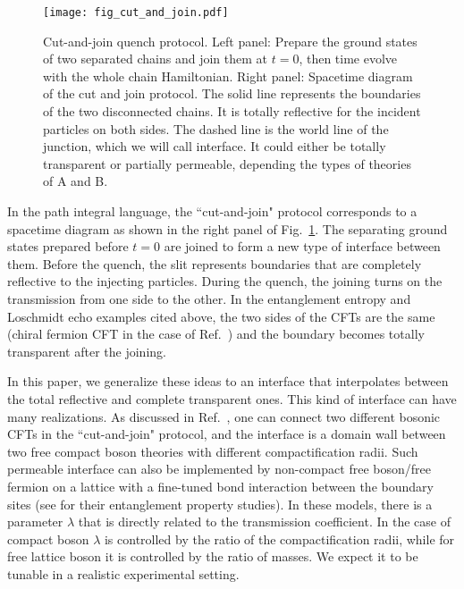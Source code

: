\begin{figure}[h]
\texttt{[image: fig\_cut\_and\_join.pdf]}
\caption{Cut-and-join quench protocol. Left panel: Prepare the ground states of two separated chains and join them at $t = 0$, then time evolve with the whole chain Hamiltonian. Right panel: Spacetime diagram of the cut and join protocol. The solid line represents the boundaries of the two disconnected chains. It is totally reflective for the incident particles on both sides. The dashed line is the world line of the junction, which we will call interface. It could either be totally transparent or partially permeable, depending the types of theories of A and B.}
\label{fig:cut-and-join}
\end{figure}

In the path integral language, the ``cut-and-join" protocol corresponds to a spacetime diagram as shown in the right panel of Fig.~\ref{fig:cut-and-join}. The separating ground states prepared before $t = 0$ are joined to form a new type of interface between them. Before the quench, the slit represents boundaries that are completely reflective to the injecting particles. During the quench, the joining turns on the transmission from one side to the other. In the entanglement entropy and Loschmidt echo examples cited above\cite{calabrese_entanglement_2007, calabrese_quantum_2016, vasseur_universal_2014}, the two sides of the CFTs are the same (chiral fermion CFT in the case of Ref.~) and the boundary becomes totally transparent after the joining. 

In this paper, we generalize these ideas to an interface that interpolates between the total reflective and complete transparent ones. This kind of interface can have many realizations. As discussed in Ref.~, one can connect two different bosonic CFTs in the ``cut-and-join" protocol, and the interface is a domain wall between two free compact boson theories with different compactification radii. Such permeable interface can also be implemented by non-compact free boson/free fermion on a lattice with a fine-tuned bond interaction between the boundary sites (see  for their entanglement property studies).
In these models, there is a parameter $\lambda$ that is directly related to the transmission coefficient. In the case of compact boson $\lambda$ is controlled by the ratio of the compactification radii, while for free lattice boson it is controlled by the ratio of masses. We expect it to be tunable in a realistic experimental setting.

